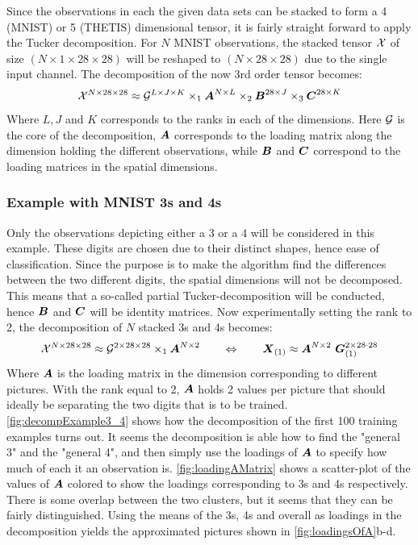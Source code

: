 Since the observations in each the given data sets can be stacked to form a 4 (MNIST) or 5 (THETIS) dimensional tensor, it is fairly straight forward to apply the Tucker decomposition. For $N$ MNIST observations, the stacked tensor $\mathcal{X}$ of size $(N \times 1 \times 28 \times 28)$ will be reshaped to $(N\times 28 \times 28)$ due to the single input channel. The decomposition of the now 3rd order tensor becomes:
\begin{equation}
    \mathcal{X}^{N\times 28 \times 28} \approx \mathcal{G}^{L\times J \times K} \times_1 \boldsymbol{A}^{N\times L} \times_2 \boldsymbol{B}^{28 \times J} \times_3 \boldsymbol{C}^{28 \times K}
\end{equation}
Where $L, J$ and $K$ corresponds to the ranks in each of the dimensions. Here $\mathcal{G}$ is the core of the decomposition, $\boldsymbol{A}$ corresponds to the loading matrix along the dimension holding the different observations, while $\boldsymbol{B}$ and $\boldsymbol{C}$ correspond to the loading matrices in the spatial dimensions.

\subsubsection{Example with MNIST 3s and 4s}
Only the observations depicting either a 3 or a 4 will be considered in this example. These digits are chosen due to their distinct shapes, hence ease of classification. Since the purpose is to make the algorithm find the differences between the two different digits, the spatial dimensions will not be decomposed. This means that a so-called partial Tucker-decomposition will be conducted, hence $\boldsymbol{B}$ and $\boldsymbol{C}$ will be identity matrices. Now experimentally setting the rank to 2, the decomposition of $N$ stacked 3s and 4s becomes:
\begin{equation}
    \tensor{X}^{N\times 28\times 28} \approx \tensor{G}^{2 \times 28 \times 28} \times_1 \bs{A}^{N\times 2} \qquad \Leftrightarrow \qquad \bs{X}_{(1)} \approx \bs{A}^{N\times 2} \ \bs{G}^{2 \times 28\cdot 28}_{(1)}
    \label{eq:tuckerMNISTinput}
\end{equation}
Where $\boldsymbol{A}$ is the loading matrix in the dimension corresponding to different pictures. With the rank equal to 2, $\boldsymbol{A}$ holds 2 values per picture that should ideally be separating the two digits that is to be trained. \autoref{fig:decompExample3_4} shows how the decomposition of the first 100 training examples turns out. It seems the decomposition is able how to find the "general 3" and the "general 4", and then simply use the loadings of $\boldsymbol{A}$ to specify how much of each it an observation is. \autoref{fig:loadingAMatrix} shows a scatter-plot of the values of $\boldsymbol{A}$ colored to show the loadings corresponding to 3s and 4s respectively. There is some overlap between the two clusters, but it seems that they can be fairly distinguished. Using the means of the 3s, 4s and overall as loadings in the decomposition yields the approximated pictures shown in \autoref{fig:loadingsOfA}b-d.

